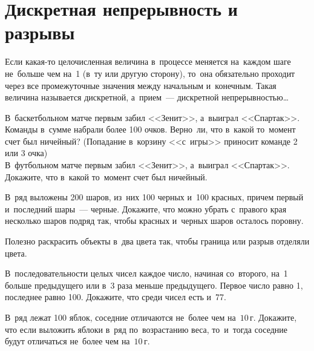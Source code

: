 
\section*{Дискретная непрерывность и разрывы}



Если какая-то целочисленная величина в~процессе меняется на~каждом шаге
не~больше чем на~1 (в~ту или другую сторону), то~она обязательно проходит через
все промежуточные значения между начальным и~конечным.
Такая величина называется дискретной, а~прием~---
дискретной непрерывностью\ldots

\begin{problems}

\item
\subproblem
В~баскетбольном матче первым забил <<Зенит>>, а~выиграл <<Спартак>>.
Команды в~сумме набрали более 100 очков.
Верно~ли, что в~какой то~момент счет был ничейный?
(Попадание в~корзину <<с~игры>> приносит команде 2 или 3 очка)
\\
\subproblem
В~футбольном матче первым забил <<Зенит>>, а~выиграл <<Спартак>>.
Докажите, что в~какой то~момент счет был ничейный.

\item
В~ряд выложены 200 шаров, из~них 100 черных и~100 красных, причем первый
и~последний шары~--- черные.
Докажите, что можно убрать с~правого края несколько шаров подряд так, чтобы
красных и~черных шаров осталось поровну.

\end{problems}

Полезно раскрасить объекты в~два цвета так, чтобы граница или разрыв отделяли
цвета.

\begin{problems}

\item
В~последовательности целых чисел каждое число, начиная со~второго, на~1 больше
предыдущего или в~3 раза меньше предыдущего.
Первое число равно 1, последнее равно 100.
Докажите, что среди чисел есть и~77.


\item
В~ряд лежат 100 яблок, соседние отличаются не~более чем на~$10\,\text{г}$.
Докажите, что если выложить яблоки в~ряд по~возрастанию веса, то~и~тогда
соседние будут отличаться не~более чем на~$10\,\text{г}$.

\end{problems}


